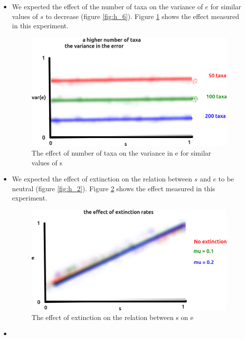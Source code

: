 \begin{itemize}
\item We expected the effect of the number of taxa on the variance
of $e$ for similar values of $s$ to decrease (figure \ref{fig:h_6}). 
Figure \ref{fig:6} shows the effect 
measured in this experiment. 

\begin{figure}[!htbp]
  \includegraphics[width=\textwidth]{fig_6.png}
  \caption{
    The effect of number of taxa on the variance in e
    for similar values of s
  }
  \label{fig:6}
\end{figure}

\item We expected the effect of extinction on the relation
between $s$ and $e$ to be neutral (figure \ref{fig:h_2}). 
Figure \ref{fig:2} shows the effect 
measured in this experiment. 

\begin{figure}[!htbp]
  \includegraphics[width=\textwidth]{fig_2.png}
  \caption{
    The effect of extinction on the relation between s on e
  }
  \label{fig:2}
\end{figure}


\item

\end{itemize}



